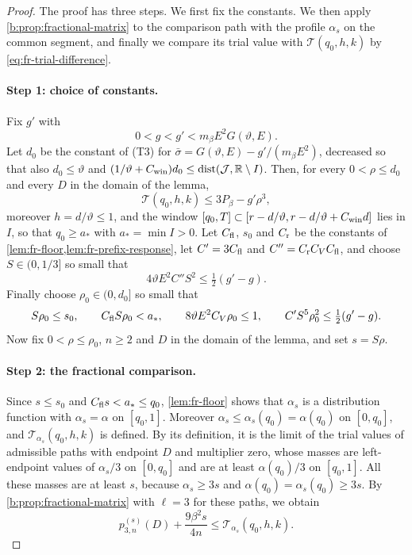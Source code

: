 \begin{proof}
The proof has three steps. We first fix the constants. We then apply \cref{b:prop:fractional-matrix} to the comparison path with the profile $\alpha_s$ on the common segment, and finally we compare its trial value with $\mathcal T(q_0,h,k)$ by \eqref{eq:fr-trial-difference}.

\paragraph{Step 1: choice of constants.} Fix $g'$ with
\begin{equation}\label{b:eq:static-gap-choice}
 0<g<g'<m_\beta E^2G(\vartheta,E).
\end{equation}
Let $d_0$ be the constant of (T3) for $\bar\sigma=G(\vartheta,E)-g'/(m_\beta E^2)$, decreased so that also $d_0\le\vartheta$ and $(1/\vartheta+C_{\rm win})d_0\le\operatorname{dist}(\mathcal J,\mathbb R\setminus I)$. Then, for every $0<\rho\le d_0$ and every $D$ in the domain of the lemma,
\begin{equation}\label{b:eq:local-static-input}
 \mathcal T(q_0,h,k)\le3P_\beta-g'\rho^3,
\end{equation}
moreover $h=d/\vartheta\le1$, and the window $[q_0,T]\subset[r-d/\vartheta,r-d/\vartheta+C_{\rm win}d]$ lies in $I$, so that $q_0\ge a_*$ with $a_*=\min I>0$. Let $C_{\rm fl}$, $s_0$ and $C_{\rm r}$ be the constants of \cref{lem:fr-floor,lem:fr-prefix-response}, let $C'=3C_{\rm fl}$ and $C''=C_{\rm r}C_VC_{\rm fl}$, and choose $S\in(0,1/3]$ so small that
\begin{equation}\label{eq:fr-S}
 4\vartheta E^2C''S^2\le\tfrac12(g'-g).
\end{equation}
Finally choose $\rho_0\in(0,d_0]$ so small that
\[
 S\rho_0\le s_0,\qquad C_{\rm fl}S\rho_0<a_*,\qquad 8\vartheta E^2C_V\rho_0\le1,\qquad C'S^5\rho_0^2\le\tfrac12(g'-g).
\]
Now fix $0<\rho\le\rho_0$, $n\ge2$ and $D$ in the domain of the lemma, and set $s=S\rho$.

\paragraph{Step 2: the fractional comparison.} Since $s\le s_0$ and $C_{\rm fl}s<a_*\le q_0$, \cref{lem:fr-floor} shows that $\alpha_s$ is a distribution function with $\alpha_s=\alpha$ on $[q_0,1]$. Moreover $\alpha_s\le\alpha_s(q_0)=\alpha(q_0)$ on $[0,q_0]$, and $\mathcal T_{\alpha_s}(q_0,h,k)$ is defined. By its definition, it is the limit of the trial values of admissible paths with endpoint $D$ and multiplier zero, whose masses are left-endpoint values of $\alpha_s/3$ on $[0,q_0]$ and are at least $\alpha(q_0)/3$ on $[q_0,1]$. All these masses are at least $s$, because $\alpha_s\ge3s$ and $\alpha(q_0)=\alpha_s(q_0)\ge3s$. By \cref{b:prop:fractional-matrix} with $\ell=3$ for these paths, we obtain
\begin{equation}\label{eq:fr-step2}
 p^{(s)}_{3,n}(D)+\frac{9\beta^2s}{4n}\le\mathcal T_{\alpha_s}(q_0,h,k).
\end{equation}


\end{proof}

